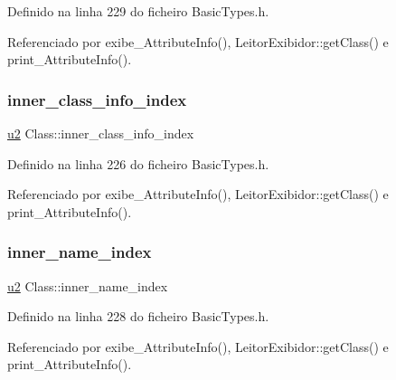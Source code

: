 Definido na linha 229 do ficheiro Basic\+Types.\+h.



Referenciado por exibe\+\_\+\+Attribute\+Info(), Leitor\+Exibidor\+::get\+Class() e print\+\_\+\+Attribute\+Info().

\mbox{\label{structClass_a77e310982b1471782be2caf432cb9af0}} 
\subsubsection{\texorpdfstring{inner\+\_\+class\+\_\+info\+\_\+index}{inner\_class\_info\_index}}
{\footnotesize\ttfamily \hyperlink{BasicTypes_8h_a732cde1300aafb73b0ea6c2558a7a54f}{u2} Class\+::inner\+\_\+class\+\_\+info\+\_\+index}



Definido na linha 226 do ficheiro Basic\+Types.\+h.



Referenciado por exibe\+\_\+\+Attribute\+Info(), Leitor\+Exibidor\+::get\+Class() e print\+\_\+\+Attribute\+Info().

\mbox{\label{structClass_a21dcd0b51d443a4cbaa870d658281105}} 
\subsubsection{\texorpdfstring{inner\+\_\+name\+\_\+index}{inner\_name\_index}}
{\footnotesize\ttfamily \hyperlink{BasicTypes_8h_a732cde1300aafb73b0ea6c2558a7a54f}{u2} Class\+::inner\+\_\+name\+\_\+index}



Definido na linha 228 do ficheiro Basic\+Types.\+h.



Referenciado por exibe\+\_\+\+Attribute\+Info(), Leitor\+Exibidor\+::get\+Class() e print\+\_\+\+Attribute\+Info().

\mbox{\label{structClass_a57bc4e6c8f985b9ee267d190e612dca8}} 
